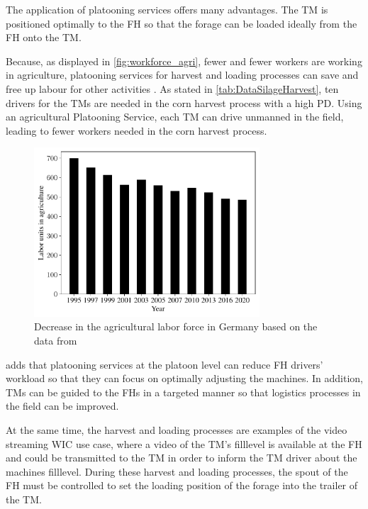 The application of platooning services offers many advantages.
The \ac{TM} is positioned optimally to the \ac{FH} so that the forage can be loaded ideally from the \ac{FH} onto the \ac{TM}.

Because, as displayed in \autoref{fig:workforce_agri}, fewer and fewer workers are working in agriculture, platooning services for harvest and loading processes can save and free up labour for other activities \cite{liu_automation_2022}. As stated in \autoref{tab:DataSilageHarvest}, ten drivers for the \ac{TM}s are needed in the corn harvest process with a high \ac{PD}. Using an agricultural Platooning Service, each \ac{TM} can drive unmanned in the field, leading to fewer workers needed in the corn harvest process.

\begin{figure}[H]
	\centering
	\includegraphics[width=0.75\textwidth]{figures/WorkForceAgriculture.pdf}
	\caption{Decrease in the agricultural labor force in Germany based on the data from \cite{bmel2020}}%
	\label{fig:workforce_agri}%
\end{figure}

\textcite{smolnik_5g_2020} adds that platooning services at the platoon level can reduce \ac{FH} drivers' workload so that they can focus on optimally adjusting the machines.
In addition, \ac{TM}s can be guided to the \ac{FH}s in a targeted manner so that logistics processes in the field can be improved.

At the same time, the harvest and loading processes are examples of the video streaming \ac{WIC} use case, where a video of the \ac{TM}'s filllevel is available at the \ac{FH} and could be transmitted to the \ac{TM} in order to inform the \ac{TM} driver about the machines filllevel. During these harvest and loading processes, the spout of the \ac{FH} must be controlled to set the loading position of the forage into the trailer of the \ac{TM}.

